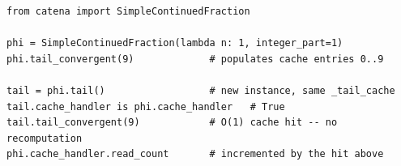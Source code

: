 \begin{catenadef}
\begin{lstlisting}[style=python]
from catena import SimpleContinuedFraction

phi = SimpleContinuedFraction(lambda n: 1, integer_part=1)
phi.tail_convergent(9)             # populates cache entries 0..9

tail = phi.tail()                  # new instance, same _tail_cache
tail.cache_handler is phi.cache_handler   # True
tail.tail_convergent(9)            # O(1) cache hit -- no recomputation
phi.cache_handler.read_count       # incremented by the hit above
\end{lstlisting}
\end{catenadef}